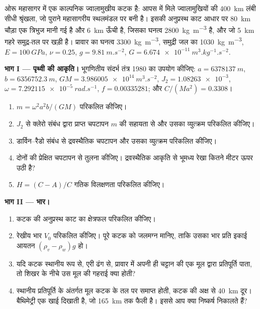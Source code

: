 \begin{problem}
\label{pb:b3:gravity-geodesy:1}
ओरू महासागर में एक काल्पनिक ज्वालामुखीय कटक है: आपस में मिले ज्वालामुखियों की
\qty{400}{km} लंबी सीधी श्रृंखला, जो पुराने महासागरीय स्थलमंडल पर बनी है।
इसकी अनुप्रस्थ काट आधार पर \qty{80}{km} चौड़ा एक त्रिभुज मानी गई है और
\qty{6}{km} ऊँची है, जिसका घनत्व \qty{2800}{kg.m^{-3}} है, और जो
\qty{5}{km} गहरे समुद्र-तल पर खड़ी है। प्रावार का घनत्व \qty{3300}{kg.m^{-3}},
समुद्री जल का \qty{1030}{kg.m^{-3}}, $E = \qty{100}{GPa}$, $\nu = 0.25$, $g =
\qty{9.81}{m.s^{-2}}$, $G = \qty{6.674e-11}{m^3.kg^{-1}.s^{-2}}$.

\medskip
\noindent\textbf{भाग I --- पृथ्वी की आकृति।} भूगणितीय संदर्भ तंत्र
1980 का उपयोग कीजिए: $a = \qty{6378137}{m}$, $b = \qty{6356752.3}{m}$,
$GM = \qty{3.986005e14}{m^3.s^{-2}}$, $J_2 = \num{1.08263e-3}$,
$\omega = \qty{7.292115e-5}{rad.s^{-1}}$, $f = \num{0.00335281}$; और
$C/(Ma^2) = \num{0.3308}$।
\begin{enumerate}
  \item $m = \omega^2a^2b/(GM)$ परिकलित कीजिए।
  \item $J_2$ से क्लेरो संबंध द्वारा प्राप्त चपटापन
        $m$ की सहायता से और उसका व्युत्क्रम परिकलित कीजिए।
  \item डार्विन--रैडो संबंध से द्रवस्थैतिक चपटापन और उसका व्युत्क्रम
        परिकलित कीजिए।
  \item दोनों की प्रेक्षित चपटापन से तुलना कीजिए। द्रवस्थैतिक आकृति से
        भूमध्य रेखा कितने मीटर ऊपर उठी है?
  \item $H = (C - A)/C$ गतिक विलक्षणता परिकलित कीजिए।
\end{enumerate}

\noindent\textbf{भाग II --- भार।}
\begin{enumerate}[resume]
  \item कटक की अनुप्रस्थ काट का क्षेत्रफल परिकलित कीजिए।
  \item रेखीय भार $V_0$ परिकलित कीजिए। पूरे कटक को जलमग्न मानिए, ताकि
        उसका भार प्रति इकाई आयतन $(\rho_v - \rho_w)g$ हो।
  \item यदि कटक स्थानीय रूप से, एरी ढंग से, प्रावार में अपनी ही चट्टान की
        एक मूल द्वारा प्रतिपूर्ति पाता, तो शिखर के नीचे उस मूल की गहराई क्या
        होती?
  \item स्थानीय प्रतिपूर्ति के अंतर्गत मूल कटक के तल पर समाप्त होती,
        कटक की अक्ष से \qty{40}{km} दूर। बैथिमेट्री एक खाई दिखाती है, जो
        \qty{165}{km} तक फैली है। इससे आप क्या निष्कर्ष निकालते हैं?
\end{enumerate}


\end{problem}
